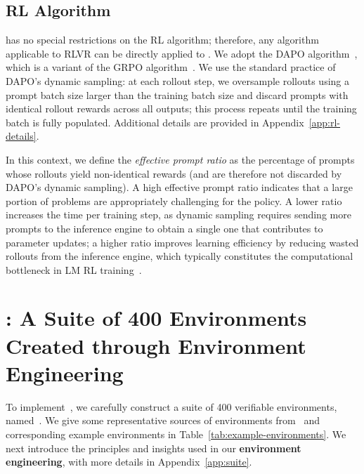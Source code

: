 \documentclass{article}
\theoremstyle{plain}
\theoremstyle{definition}
\theoremstyle{remark}
\begin{document}
\subsection{RL Algorithm}

\ours{} has no special restrictions on the RL algorithm; therefore, any algorithm applicable to RLVR can be directly applied to \ours{}.
We adopt the DAPO algorithm~\citep{yu2025dapo}, which is a variant of the GRPO algorithm~\citep{shao2024grpo}.
We use the standard practice of DAPO's dynamic sampling:
at each rollout step, we oversample rollouts using a prompt batch size larger than the training batch size and discard prompts with identical rollout rewards across all outputs;
this process repeats until the training batch is fully populated.
Additional details are provided in Appendix~\ref{app:rl-details}.

In this context, we define the \textit{effective prompt ratio} as the percentage of prompts whose rollouts yield non-identical rewards (and are therefore not discarded by DAPO’s dynamic sampling).
A high effective prompt ratio indicates that a large portion of problems are appropriately challenging for the policy.
A lower ratio increases the time per training step, as dynamic sampling requires sending more prompts to the inference engine to obtain a single one that contributes to parameter updates;
a higher ratio improves learning efficiency by reducing wasted rollouts from the inference engine, which typically constitutes the computational bottleneck in LM RL training~\citep{hu2024openrlhf}.


\section{\suite{}: A Suite of 400 Environments Created through Environment Engineering}
\label{sec:gym}
To implement~\ours{}, we carefully construct a suite of 400 verifiable environments, named~\suite{}.
We give some representative sources of environments from~\suite{} and corresponding example environments in Table~\ref{tab:example-environments}.
We next introduce the principles and insights used in our \textbf{environment engineering}, with more details in Appendix~\ref{app:suite}.
\end{document}
